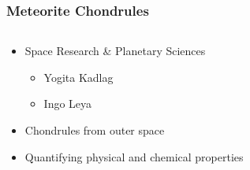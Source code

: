 \documentclass[aspectratio=169]{beamer}
\begin{document}
\begin{frame}
	\frametitle{Meteorite Chondrules}
	\begin{columns}
		\begin{column}{0.495\linewidth}
			\begin{itemize}
				\item Space Research \& Planetary Sciences
				\begin{itemize}%
					\item Yogita Kadlag
					\item Ingo Leya
				\end{itemize}
				\item Chondrules from outer space
				\item Quantifying physical and chemical properties
			\end{itemize}
		\end{column}
		\begin{column}{0.495\linewidth}
%
		\end{column}
	\end{columns}
\end{frame}
\end{document}

